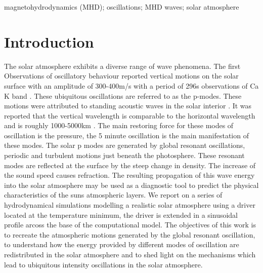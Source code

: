 \documentclass[final,1p]{elsarticle}
\begin{document}
\begin{keyword}
magnetohydrodynamics (MHD); oscillations; MHD waves; solar atmosphere
\end{keyword}
\maketitle




\section{Introduction}
\setcounter{equation}{0}
The solar atmosphere exhibits a diverse range of wave phenomena. The first Observations of oscillatory behaviour reported vertical motions on the solar surface with an amplitude of 300-400m/s with a period of 296s observations of Ca K band \cite{Leighton1960}. These ubiquitous oscillations are referred to as the p-modes.
These motions were attributed to standing acoustic waves in the solar interior \cite{Ulrich1970}. It was reported that the vertical wavelength is comparable to the horizontal wavelength and is roughly 1000-5000km \cite{Leibacher1971}.  The main restoring force for these modes of oscillation is the pressure, the 5 minute oscillation is the main manifestation of these modes.  The solar p modes are generated by global resonant oscillations, periodic  and turbulent motions just beneath the photosphere.  These resonant modes are reflected at the surface by the steep change in density. The increase of the sound speed causes refraction.   The resulting propagation of this wave energy into the solar atmosphere may be used as a diagnostic tool to predict the physical characteristics of the  suns atmospheric layers. We report on a series of hydrodynamical simulations modelling a realistic solar atmosphere using a driver located at the temperature minimum, the driver is extended in a sinusoidal profile arcoss the base of the computational model.  The objectives of this work is to recreate the atmospheric motions generated by the global resonant oscillation, to  understand how the energy provided by different modes of oscillation are redistributed in the solar atmosphere and to shed light on the mechanisms which lead to ubiquitous intensity oscillations in the solar atmosphere.   
\end{document}
